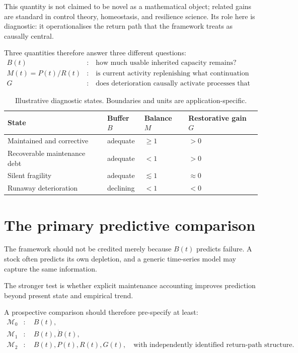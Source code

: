 \documentclass[11pt,a4paper]{article}
\begin{document}
This quantity is not claimed to be novel as a mathematical object; related gains are standard in control theory, homeostasis, and resilience science. Its role here is diagnostic: it operationalises the return path that the framework treats as causally central.

Three quantities therefore answer three different questions:
\begin{align}
B(t) &:\quad \text{how much usable inherited capacity remains?}\\
M(t)=P(t)/R(t) &:\quad \text{is current activity replenishing what continuation requires?}\\
G &:\quad \text{does deterioration causally activate processes that restore the required condition?}
\end{align}

\begin{table}[htbp]
\centering
\small
\begin{tabular}{llll}
\toprule
State & Buffer $B$ & Balance $M$ & Restorative gain $G$ \\
\midrule
Maintained and corrective & adequate & $\ge1$ & $>0$ \\
Recoverable maintenance debt & adequate & $<1$ & $>0$ \\
Silent fragility & adequate & $\lesssim1$ & $\approx0$ \\
Runaway deterioration & declining & $<1$ & $<0$ \\
\bottomrule
\end{tabular}
\caption{Illustrative diagnostic states. Boundaries and units are application-specific.}
\label{tab:diagnostic-states}
\end{table}

\section{The primary predictive comparison}

The framework should not be credited merely because $B(t)$ predicts failure. A stock often predicts its own depletion, and a generic time-series model may capture the same information.

The stronger test is whether explicit maintenance accounting improves prediction beyond present state and empirical trend.

A prospective comparison should therefore pre-specify at least:
\begin{align}
\mathcal M_0 &: \quad B(t),\\
\mathcal M_1 &: \quad B(t),\dot B(t),\\
\mathcal M_2 &: \quad B(t),P(t),R(t),G(t),
\quad\text{with independently identified return-path structure}.
\end{align}
\end{document}

